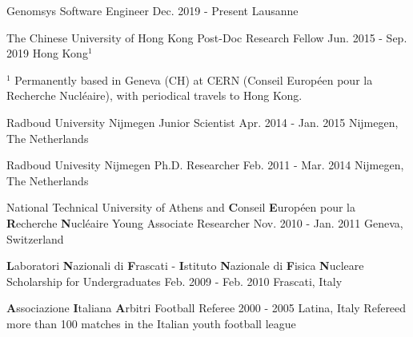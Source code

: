 
\begin{cventries}
\cventry
{Genomsys} %
{Software Engineer} %
{Dec. 2019 - Present} %
{Lausanne} %
{\Genomsys}

\cventry
{The Chinese University of Hong Kong} %
{Post-Doc Research Fellow} %
{Jun. 2015 - Sep. 2019} %
{Hong Kong$^{1}$}
{\CHUK}
\vspace{-0.5em}
        
{\tiny $^{1}$ Permanently based in Geneva (CH) at CERN (Conseil Europ\'een pour
la Recherche Nucl\'eaire), with periodical travels to Hong Kong.}

\cventry
{Radboud University Nijmegen} %
{Junior Scientist} %
{Apr. 2014 - Jan. 2015} %
{Nijmegen, The Netherlands} %
{\JuniorScientist}

\cventry
{Radboud Univesity Nijmegen} %
{Ph.D. Researcher} %
{Feb. 2011  - Mar. 2014} %
{Nijmegen, The Netherlands} %
{\Phd}

\cventry
{National Technical University of Athens and \textbf{C}onseil
\textbf{E}urop\'een pour la \textbf{R}echerche
\textbf{N}ucl\'eaire} %
{Young Associate Researcher} %
{Nov. 2010 - Jan. 2011} %
{Geneva, Switzerland} %
{\CERN}

\cventry
{\textbf{L}aboratori \textbf{N}azionali di \textbf{F}rascati -
\textbf{I}stituto \textbf{N}azionale di \textbf{F}isica \textbf{N}ucleare} %
{Scholarship for Undergraduates} %
{Feb. 2009 - Feb. 2010} %
{Frascati, Italy} %
{\Master}

\cventry
{\textbf{A}ssociazione \textbf{I}taliana \textbf{A}rbitri} %
{Football Referee} %
{2000 - 2005} %
{Latina, Italy} %
{Refereed more than 100 matches in the Italian youth football league}

\end{cventries}
